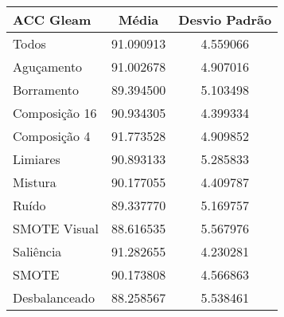 
\begin{table}[!htbp]
\centering
\caption{}
\label{tab:resultados:x:melhor}
\begin{tabular}{|l|c|c|}
\hline
\textbf{ACC Gleam} & \textbf{Média}     & \textbf{Desvio Padrão} \\ \hline
   Todos         &  91.090913 &  4.559066  \\ \hline
  Aguçamento     &  91.002678 &  4.907016  \\ \hline
  Borramento     &  89.394500 &  5.103498  \\ \hline
  Composição 16  &  90.934305 &  4.399334  \\ \hline
  Composição 4   &  91.773528 &  4.909852  \\ \hline
  Limiares       &  90.893133 &  5.285833  \\ \hline
  Mistura        &  90.177055 &  4.409787  \\ \hline
  Ruído          &  89.337770 &  5.169757  \\ \hline
  SMOTE Visual   &  88.616535 &  5.567976  \\ \hline
  Saliência      &  91.282655 &  4.230281  \\ \hline
 SMOTE           &  90.173808 &  4.566863  \\ \hline
Desbalanceado    &  88.258567 &  5.538461  \\ \hline
\end{tabular}
\end{table}


